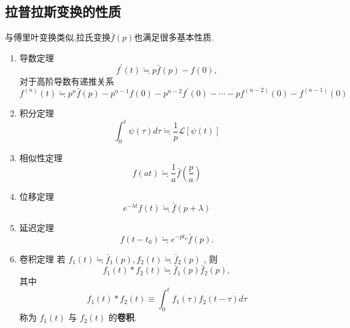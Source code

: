 \subsection{拉普拉斯变换的性质}
与傅里叶变换类似,拉氏变换$\bar{f}(p)$也满足很多基本性质.
\begin{enumerate}
    \item 导数定理
        \begin{equation}
        f^{\prime}(t) \fallingdotseq  p \bar{f}(p)-f(0),
        \end{equation}
        对于高阶导数有递推关系
        \begin{equation}
            f^{(n)}(t) \fallingdotseq p^n \bar{f}(p)-p^{n-1} f(0)-p^{n-2} f^{\prime}(0)-\cdots-p f^{(n-2)}(0)-f^{(n-1)}(0)
        \end{equation}
        \label{eq:lapl_trans_derivative}
    \item 积分定理
        \begin{equation}
        \int_0^t \psi(\tau) d \tau \fallingdotseq  \frac{1}{p} \mathcal{L}[\psi(t)]
        \end{equation}
    \item 相似性定理 
    \begin{equation}
         f(a t) \fallingdotseq  
         \frac{1}{a} \bar{f}\left(\frac{p}{a}\right)
    \end{equation}
        
    \item 位移定理 
        \begin{equation}       
         e^{-\lambda t} f(t) \fallingdotseq  \bar{f}(p+\lambda)
        \end{equation}

    \item 延迟定理 
    \begin{equation}       
        f\left(t-t_0\right) \fallingdotseq  e^{-p t_0} \bar{f}(p).
    \end{equation}

    \item 卷积定理 若  $f_1(t) \fallingdotseq  \bar{f}_1(p), f_2(t) \fallingdotseq  \bar{f}_2(p)$ , 则 
    \begin{equation}       
        f_1(t) * f_2(t) \fallingdotseq  \bar{f}_1(p) \bar{f}_2(p),
    \end{equation}
    其中
    \begin{equation}        
    f_1(t) * f_2(t) \equiv \int_0^t f_1(\tau) f_2(t-\tau) d \tau
    \end{equation}
    称为 $f_1(t)$ 与 $f_2(t)$ 的\textbf{卷积}.
\end{enumerate}

